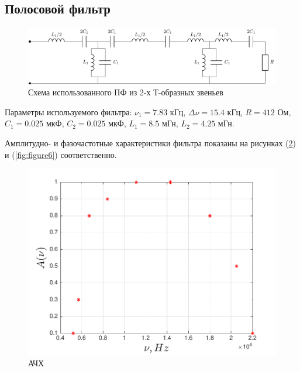 \subsection{Полосовой фильтр}
\begin{figure}[H]
	\centering
	\includegraphics[scale=1]{chem/chem4}
	\caption{ Схема использованного ПФ из 2-х Т-образных звеньев}
	\label{fig:chem4}
\end{figure}
Параметры используемого фильтра: $\nu_1=7.83$ кГц, $\Delta\nu=15.4$ кГц, $R=412$ Ом, $C_1=0.025$ мкФ,
$C_2=0.025$ мкФ, $L_1=8.5$ мГн, $L_2=4.25$ мГн. 

Амплитудно- и фазочастотные характеристики фильтра показаны на рисунках (\ref{fig:figure5}) и (\ref{fig:figure6}) соответственно.

\begin{figure}[H]
	\centering
	\includegraphics[scale=0.9]{graph/graph5}
	\caption{АЧХ}
	\label{fig:figure5}
\end{figure}

